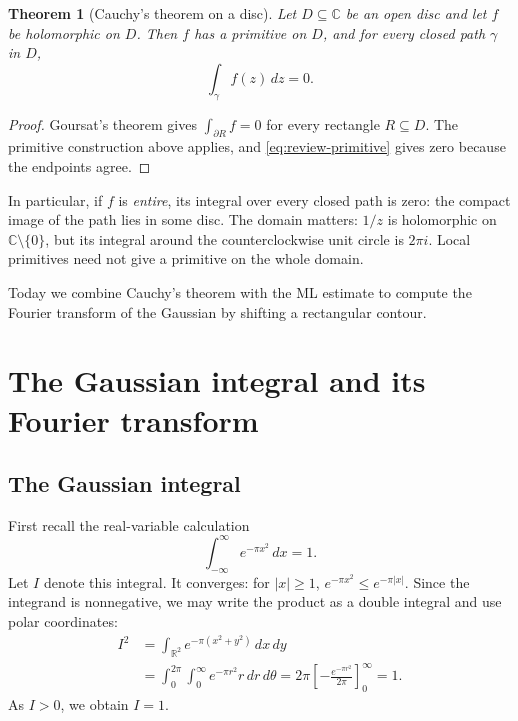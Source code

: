 \documentclass[11pt]{article}
\theoremstyle{plain}
\newtheorem{theorem}{Theorem}[section]
\theoremstyle{definition}
\theoremstyle{remark}
\numberwithin{equation}{section}
\newcommand{\C}{\mathbb{C}}
\newcommand{\R}{\mathbb{R}}
\begin{document}
\begin{theorem}[Cauchy's theorem on a disc]\label{thm:review-cauchy}
Let $D\subseteq\C$ be an open disc and let $f$ be holomorphic on $D$.
Then $f$ has a primitive on $D$, and for every closed path $\gamma$ in $D$,
\begin{equation}\label{eq:review-cauchy}
 \boxed{\displaystyle\int_\gamma f(z)\,dz=0.}
\end{equation}
\end{theorem}
\begin{proof}
Goursat's theorem gives $\int_{\partial R}f=0$ for every rectangle
$R\subseteq D$. The primitive construction above applies, and
\eqref{eq:review-primitive} gives zero because the endpoints agree.
\end{proof}

In particular, if $f$ is \emph{entire}, its integral over every closed
path is zero: the compact image of the path lies in some disc.
The domain matters: $1/z$ is holomorphic on $\C\setminus\{0\}$, but
its integral around the counterclockwise unit circle is $2\pi i$.
Local primitives need not give a primitive on the whole domain.

Today we combine Cauchy's theorem with the ML estimate to compute the
Fourier transform of the Gaussian by shifting a rectangular contour.

\newpage
\section{The Gaussian integral and its Fourier transform}
\subsection{The Gaussian integral}
First recall the real-variable calculation
\begin{equation}\label{eq:gaussian}
 \int_{-\infty}^{\infty}e^{-\pi x^2}\,dx=1.
\end{equation}
Let $I$ denote this integral. It converges: for $|x|\geq1$,
$e^{-\pi x^2}\leq e^{-\pi|x|}$. Since the integrand is nonnegative, we may
write the product as a double integral and use polar coordinates:
\begin{align*}
 I^2
 &=\int_{\R^2}e^{-\pi(x^2+y^2)}\,dx\,dy\\
 &=\int_0^{2\pi}\int_0^\infty e^{-\pi r^2}r\,dr\,d\theta
 =2\pi\left[-\frac{e^{-\pi r^2}}{2\pi}\right]_{0}^{\infty}=1.
\end{align*}
As $I>0$, we obtain $I=1$.
\end{document}
